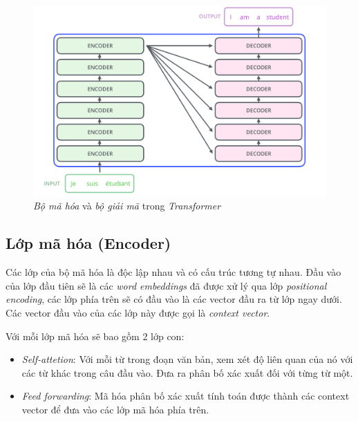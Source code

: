 \begin{figure}[H]
    \begin{center}
        \includegraphics[scale=0.35]{images/The_transformer_encoder_decoder_stack}
        \caption{\textit{Bộ mã hóa} và \textit{bộ giải mã} trong \textit{Transformer}\cite{illustrated.transformer}}
        \label{fig:encoder-decoder-stack}
    \end{center}
\end{figure}



\subsection{Lớp mã hóa (Encoder)}
Các lớp của bộ mã hóa là độc lập nhau và có cấu trúc tương tự nhau. Đầu vào của lớp đầu tiên sẽ là các \textit{word embeddings} đã được xử lý qua lớp \textit{positional encoding}, các lớp phía trên sẽ có đầu vào là các vector đầu ra từ lớp ngay dưới. Các vector đầu vào của các lớp này được gọi là \textit{context vector}.

Với mỗi lớp mã hóa sẽ bao gồm 2 lớp con:
\begin{itemize}
	\item \textit{Self-attetion}: Với mỗi từ trong đoạn văn bản, xem xét độ liên quan của nó với các từ khác trong câu đầu vào. Đưa ra phân bố xác xuất đối với từng từ một.
	\item \textit{Feed forwarding}: Mã hóa phân bố xác xuất tính toán được thành các context vector để đưa vào các lớp mã hóa phía trên.
\end{itemize}

